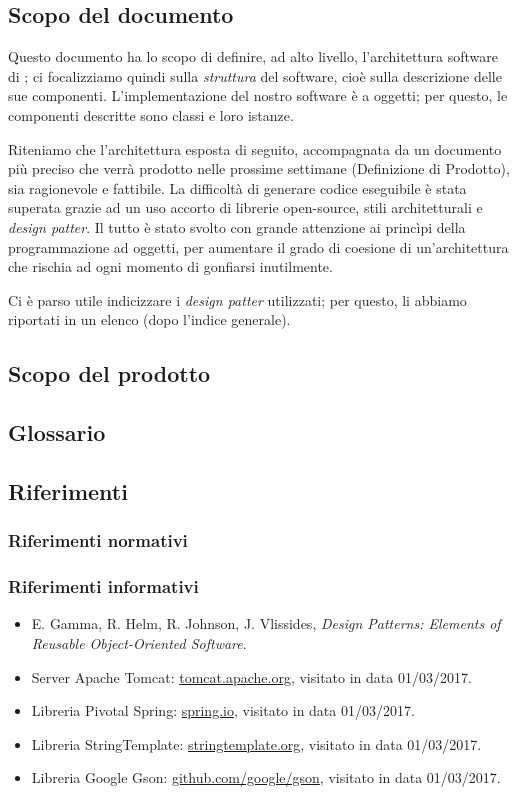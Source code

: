 
\subsection{Scopo del documento}
Questo documento ha lo scopo di definire, ad alto livello, l'architettura software di \proj; ci focalizziamo quindi sulla \emph{struttura} del software, cioè sulla descrizione delle sue componenti. L'implementazione del nostro software è a oggetti; per questo, le componenti descritte sono classi e loro istanze.

Riteniamo che l'architettura esposta di seguito, accompagnata da un documento più preciso che verrà prodotto nelle prossime settimane (Definizione di Prodotto), sia ragionevole e fattibile. La difficoltà di generare codice eseguibile è stata superata grazie ad un uso accorto di librerie open-source, stili architetturali e \emph{design patter}. Il tutto è stato svolto con grande attenzione ai princìpi della programmazione ad oggetti, per aumentare il grado di coesione di un'architettura che rischia ad ogni momento di gonfiarsi inutilmente.

Ci è parso utile indicizzare i \emph{design patter} utilizzati; per questo, li abbiamo riportati in un elenco (dopo l'indice generale).

\subsection{Scopo del prodotto}
\scopo

\subsection{Glossario}
\presgloss

\subsection{Riferimenti} \label{sec:ref}

\subsubsection{Riferimenti normativi}

\subsubsection{Riferimenti informativi}
\begin{itemize}
	\item E. Gamma, R. Helm, R. Johnson, J. Vlissides, \emph{Design Patterns: Elements of Reusable Object-Oriented Software}.
	\item Server Apache Tomcat: \url{tomcat.apache.org}, visitato in data 01/03/2017.
	\item Libreria Pivotal Spring: \url{spring.io}, visitato in data 01/03/2017.
	\item Libreria StringTemplate: \url{stringtemplate.org}, visitato in data 01/03/2017.
	\item Libreria Google Gson: \url{github.com/google/gson}, visitato in data 01/03/2017.
\end{itemize}
